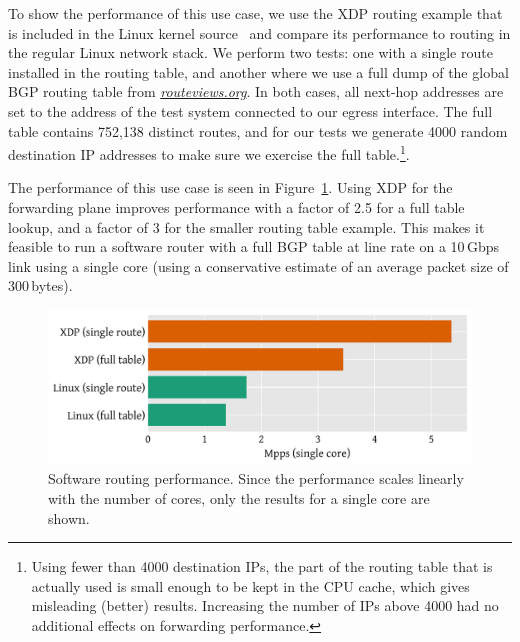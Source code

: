 \documentclass[sigconf]{acmart}
\begin{document}
To show the performance of this use case, we use the XDP routing example that is
included in the Linux kernel source~\cite{fwd-example} and compare its
performance to routing in the regular Linux network stack. We perform two tests:
one with a single route installed in the routing table, and another where we use
a full dump of the global BGP routing table from \emph{\url{routeviews.org}}. In
both cases, all next-hop addresses are set to the address of the test system
connected to our egress interface. The full table contains 752,138 distinct
routes, and for our tests we generate 4000 random destination IP addresses to
make sure we exercise the full table.\footnote{Using fewer than 4000 destination
  IPs, the part of the routing table that is actually used is small enough to be
  kept in the CPU cache, which gives misleading (better) results. Increasing the
  number of IPs above 4000 had no additional effects on forwarding
  performance.}.

The performance of this use case is seen in Figure~\ref{fig:router-fwd}. Using
XDP for the forwarding plane improves performance with a factor of 2.5 for a
full table lookup, and a factor of 3 for the smaller routing table example. This
makes it feasible to run a software router with a full BGP table at line rate on
a 10\,Gbps link using a single core (using a conservative estimate of an average
packet size of 300\,bytes).

\begin{figure}[t]
\centering
\includegraphics[width=\linewidth]{figures/router-fwd.pdf}
\caption{\label{fig:router-fwd} Software routing performance. Since the
  performance scales linearly with the number of cores, only the results for a
  single core are shown.}
\end{figure}

\end{document}
